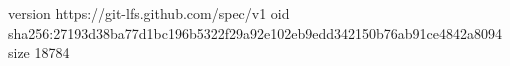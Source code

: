 version https://git-lfs.github.com/spec/v1
oid sha256:27193d38ba77d1bc196b5322f29a92e102eb9edd342150b76ab91ce4842a8094
size 18784
